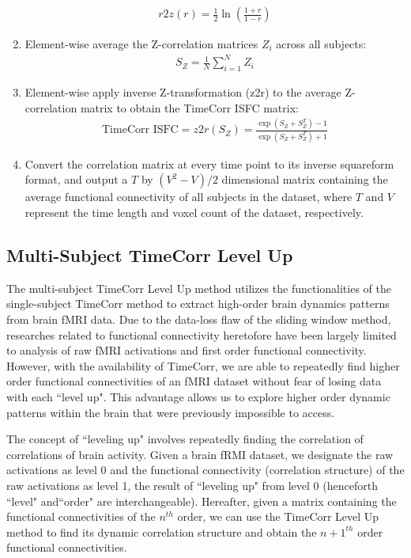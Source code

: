 \documentclass[11pt]{article}
\begin{document}
\begin{enumerate}
\begin{align*}
r2z(r) = \frac{1}{2}\ln(\frac{1+r}{1-r})
\end{align*}
\item Element-wise average the Z-correlation matrices $Z_i$ across all subjects:
\begin{align*}
S_Z = \frac{1}{N}\sum^N_{i=1}Z_i
\end{align*}
\item Element-wise apply inverse Z-transformation (z2r) to the average Z-correlation matrix to obtain the TimeCorr ISFC matrix:
\begin{align*}
\text{TimeCorr ISFC} = z2r(S_Z) = \frac{\exp(S_Z+S_Z^T)-1}{\exp(S_Z+S_Z^T)+1}
\end{align*}
\item Convert the correlation matrix at every time point to its inverse squareform format, and output a $T$ by $(V^2-V)/2$ dimensional matrix containing the average functional connectivity of all subjects in the dataset, where $T$ and $V$ represent the time length and voxel count of the dataset, respectively.
\end{enumerate}

\subsection{Multi-Subject TimeCorr Level Up}
The multi-subject TimeCorr Level Up method utilizes the functionalities of the single-subject TimeCorr method to extract high-order brain dynamics patterns from brain fMRI data. Due to the data-loss flaw of the sliding window method, researches related to functional connectivity heretofore have been largely limited to analysis of raw fMRI activations and first order functional connectivity. However, with the availability of TimeCorr, we are able to repeatedly find higher order functional connectivities of an fMRI dataset without fear of losing data with each ``level up". This advantage allows us to explore higher order dynamic patterns within the brain that were previously impossible to access.

The concept of ``leveling up" involves repeatedly finding the correlation of correlations of brain activity. Given a brain fRMI dataset, we designate the raw activations as level 0 and the functional connectivity (correlation structure) of the raw activations as level 1, the result of ``leveling up" from level 0 (henceforth ``level" and``order" are interchangeable). Hereafter, given a matrix containing the functional connectivities of the $n^{th}$ order, we can use the TimeCorr Level Up method to find its dynamic correlation structure and obtain the $n+1^{th}$ order functional connectivities.
\end{document}
